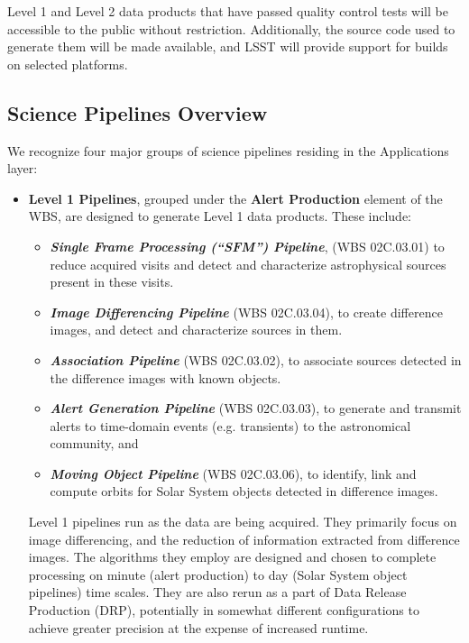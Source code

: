 \documentclass[12pt]{article}
\newcommand{\wbsSFM}{WBS 02C.03.01}
\newcommand{\wbsAssocP}{WBS 02C.03.02}
\newcommand{\wbsAP}{WBS 02C.03.03}
\newcommand{\wbsDiffim}{WBS 02C.03.04}
\newcommand{\wbsMOPS}{WBS 02C.03.06}
\begin{document}
Level 1 and Level 2 data products that have passed quality control
tests will be accessible to the public without restriction.
Additionally, the source code used to generate them will be made
available, and LSST will provide support for builds on selected
platforms.

\subsection{Science Pipelines Overview}

We recognize four major groups of science pipelines residing in the Applications layer:
\begin{itemize}
    \item {\bf Level 1 Pipelines}, grouped under the {\bf Alert Production} element of the WBS, are designed to generate Level 1 data products. These include:
    \begin{itemize}
    \item {\bf \em Single Frame Processing (``SFM'') Pipeline}, (\wbsSFM) to reduce acquired visits and detect and characterize astrophysical sources present in these visits.
    \item {\bf \em Image Differencing Pipeline} (\wbsDiffim), to create difference images, and detect and characterize sources in them.
    \item {\bf \em Association Pipeline} (\wbsAssocP), to associate sources detected in the difference images with known objects.
    \item {\bf \em Alert Generation Pipeline} (\wbsAP), to generate and transmit alerts to time-domain events (e.g. transients) to the astronomical community, and
    \item {\bf \em Moving Object Pipeline} (\wbsMOPS), to identify, link and compute orbits for Solar System objects detected in difference images.
    \end{itemize}
Level 1 pipelines run as the data are being acquired. They primarily focus on image differencing, and the reduction of information extracted from difference images. The algorithms they employ are designed and chosen to complete processing on minute (alert production) to day (Solar System object pipelines) time scales. They are also rerun as a part of Data Release Production (DRP), potentially in somewhat different configurations to achieve greater precision at the expense of increased runtime.
    

\end{itemize}
\end{document}
